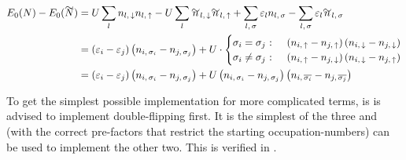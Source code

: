 \begin{equation}
    \label{eq:simplified-base-energy-hopping}
    \begin{split}
        E_0(N)-E_0(\vphantom{N}\smash{\tilde{N}}) 
        & = U\lsum n_{l,\,\down}n_{l,\,\up}-U\lsum \tilde{n}_{l,\,\down}\tilde{n}_{l,\,\up} 
        + \lsum[l,\,\sigma] \epsl n_{l,\,\sigma} - \lsum[l,\,\sigma] \epsl \tilde{n}_{l,\,\sigma}\\
        & =  \left(\epsl[i]-\epsl[j]\right)\left(n_{i,\,\sigma_i} - n_{j,\,\sigma_j}\right) +
        U\cdot \begin{cases}
            \sigma_i = \sigma_j\text{ : } & \left(n_{i,\,\up}-n_{j,\,\up}\right) \left(n_{i,\,\down}-n_{j,\,\down}\right)\\
            \sigma_i \neq \sigma_j\text{ : } & \left(n_{i,\,\up}-n_{j,\,\down}\right) \left(n_{i,\,\down}-n_{j,\,\up}\right)
        \end{cases}\\
        & = \left(\epsl[i]-\epsl[j]\right)\left(n_{i,\,\sigma_i} - n_{j,\,\sigma_j}\right) +
        U \left(n_{i,\,\sigma_i}-n_{j,\,\sigma_j}\right) \left(n_{i,\,\overline{\sigma_i}}-n_{j,\,\overline{\sigma_j}}\right)
    \end{split}
\end{equation}

To get the simplest possible implementation for more complicated terms, is is advised to implement double-flipping first.
It is the simplest of the three and (with the correct pre-factors that restrict the starting occupation-numbers) can be used to implement the other two.
This is verified in .
